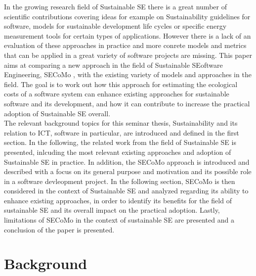 \documentclass[oribibl]{llncs}
\begin{document}
In the growing research field of Sustainable SE there is a great number of scientific contributions covering ideas for example on Sustainability guidelines for software, models for sustainable development life cycles or specific energy measurement tools for certain types of applications. However there is a lack of an evaluation of these approaches in practice and more conrete models and metrics that can be applied in a great variety of software projects are missing.
This paper aims at comparing a new approach in the field of Sustainable SEoftware Engineering, SECoMo \cite{schulze_cost_2016}, with the existing variety of models and approaches in the field. The goal is to work out how this approach for estimating the ecological costs of a software system can enhance existing approaches for sustainable software and its development, and how it can contribute to increase the practical adoption of Sustainable SE overall.\\
The relevant background topics for this seminar thesis, Sustainability and its relation to ICT, software in particular, are introduced and defined in the first section. In the following, the related work from the field of Sustainable SE is presented, inlcuding the most relevant existing approaches and adoption of Sustainable SE in practice. In addition, the SECoMo approach is introduced and described with a focus on its general purpose and motivation and its possible role in a software devleopment project. In the following section, SECoMo is then considered in the context of Sustainable SE and analyzed regarding its ability to enhance existing approaches, in order to identify its benefits for the field of sustainable SE and its overall impact on the practical adoption. Lastly, limitations of SECoMo in the context of sustainable SE are presented and a conclusion of the paper is presented.

\section{Background}
\end{document}
